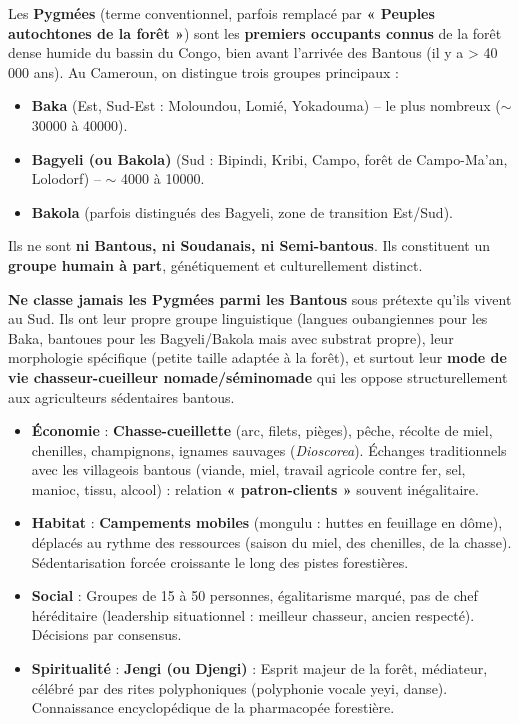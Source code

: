 \documentclass[11pt]{article}
\begin{document}
\begin{definition}
Les \textbf{Pygmées} (terme conventionnel, parfois remplacé par \textbf{« Peuples autochtones de la forêt »}) sont les \textbf{premiers occupants connus} de la forêt dense humide du bassin du Congo, bien avant l'arrivée des Bantous (il y a > 40 000 ans). Au Cameroun, on distingue trois groupes principaux :
\begin{itemize}
    \item \textbf{Baka} (Est, Sud-Est : Moloundou, Lomié, Yokadouma) -- le plus nombreux ($\sim$ \num{30000} à \num{40000}).
    \item \textbf{Bagyeli (ou Bakola)} (Sud : Bipindi, Kribi, Campo, forêt de Campo-Ma'an, Lolodorf) -- $\sim$ \num{4000} à \num{10000}.
    \item \textbf{Bakola} (parfois distingués des Bagyeli, zone de transition Est/Sud).
\end{itemize}
Ils ne sont \textbf{ni Bantous, ni Soudanais, ni Semi-bantous}. Ils constituent un \textbf{groupe humain à part}, génétiquement et culturellement distinct.
\end{definition}

\begin{attention}
\textbf{Ne classe jamais les Pygmées parmi les Bantous} sous prétexte qu'ils vivent au Sud. Ils ont leur propre groupe linguistique (langues oubangiennes pour les Baka, bantoues pour les Bagyeli/Bakola mais avec substrat propre), leur morphologie spécifique (petite taille adaptée à la forêt), et surtout leur \textbf{mode de vie chasseur-cueilleur nomade/séminomade} qui les oppose structurellement aux agriculteurs sédentaires bantous.
\end{attention}

\begin{propriete}
\begin{itemize}
    \item \textbf{Économie} : \textbf{Chasse-cueillette} (arc, filets, pièges), pêche, récolte de miel, chenilles, champignons, ignames sauvages (\textit{Dioscorea}). Échanges traditionnels avec les villageois bantous (viande, miel, travail agricole contre fer, sel, manioc, tissu, alcool) : relation \textbf{« patron-clients »} souvent inégalitaire.
    \item \textbf{Habitat} : \textbf{Campements mobiles} (mongulu : huttes en feuillage en dôme), déplacés au rythme des ressources (saison du miel, des chenilles, de la chasse). Sédentarisation forcée croissante le long des pistes forestières.
    \item \textbf{Social} : Groupes de 15 à 50 personnes, égalitarisme marqué, pas de chef héréditaire (leadership situationnel : meilleur chasseur, ancien respecté). Décisions par consensus.
    \item \textbf{Spiritualité} : \textbf{Jengi (ou Djengi)} : Esprit majeur de la forêt, médiateur, célébré par des rites polyphoniques (polyphonie vocale yeyi, danse). Connaissance encyclopédique de la pharmacopée forestière.
\end{itemize}
\end{propriete}
\end{document}
